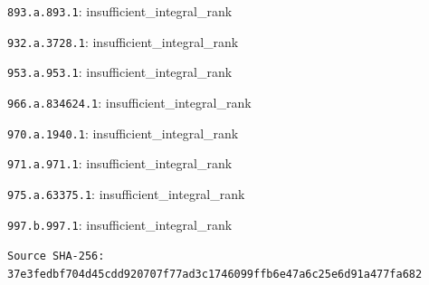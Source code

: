 \documentclass[10pt]{article}
\begin{document}
\begin{landscape}
\par\noindent\texttt{893.a.893.1}: insufficient\_integral\_rank
\par\noindent\texttt{932.a.3728.1}: insufficient\_integral\_rank
\par\noindent\texttt{953.a.953.1}: insufficient\_integral\_rank
\par\noindent\texttt{966.a.834624.1}: insufficient\_integral\_rank
\par\noindent\texttt{970.a.1940.1}: insufficient\_integral\_rank
\par\noindent\texttt{971.a.971.1}: insufficient\_integral\_rank
\par\noindent\texttt{975.a.63375.1}: insufficient\_integral\_rank
\par\noindent\texttt{997.b.997.1}: insufficient\_integral\_rank
\par\noindent\texttt{Source SHA-256: 37e3fedbf704d45cdd920707f77ad3c1746099ffb6e47a6c25e6d91a477fa682}
\end{landscape}
\end{document}
